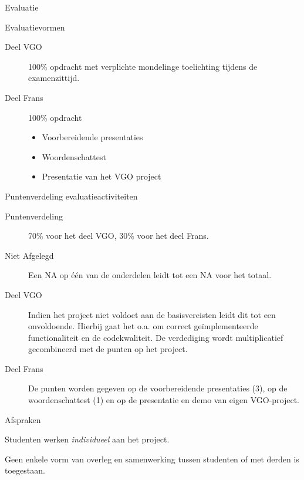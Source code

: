 \documentclass{studiewijzer}
\begin{document}
\begin{categorybox}{Evaluatie}
    \begin{category}{Evaluatievormen}
        \begin{description}
            \item[Deel VGO] 100\% opdracht met verplichte mondelinge toelichting tijdens de examenzittijd.
            \item[Deel Frans] 100\% opdracht
                    \begin{itemize}
                    \item Voorbereidende presentaties
                    \item Woordenschattest
                    \item Presentatie van het VGO project
                    \end{itemize}
        \end{description}
    \end{category}
    \categoryseparator
    \begin{category}{Puntenverdeling evaluatieactiviteiten}
        \begin{description}
            \item[Puntenverdeling] 70\% voor het deel VGO, 30\% voor het deel Frans.
            \item[Niet Afgelegd] Een NA op \'e\'en van de onderdelen leidt tot een NA voor het totaal.
            \item[Deel VGO] Indien het project niet voldoet aan de basisvereisten leidt dit tot een onvoldoende.
                    Hierbij gaat het o.a. om correct ge\"implementeerde functionaliteit en de codekwaliteit.
                    De verdediging wordt multiplicatief gecombineerd met de punten op het project.
            \item[Deel Frans] De punten worden gegeven op de voorbereidende
                    presentaties (3), op de woordenschattest (1) en op de presentatie
                    en demo van eigen VGO-project.
        \end{description}
    \end{category}
    \categoryseparator
    \begin{category}{Afspraken}
        \begin{items}
            \item Studenten werken \emph{individueel} aan het project.
            \item Geen enkele vorm van overleg en samenwerking tussen studenten of met derden is toegestaan.

\end{items}
\end{category}
\end{categorybox}
\end{document}
